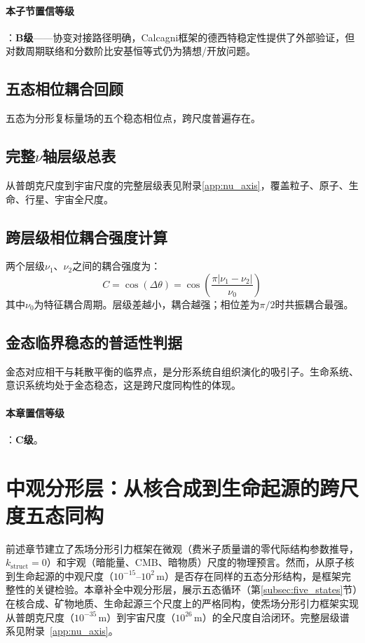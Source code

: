 \documentclass[12pt,a4paper,twocolumn]{article}
\begin{document}
\paragraph{本子节置信等级}：\textbf{B级}——协变对接路径明确，Calcagni框架的德西特稳定性提供了外部验证，但对数周期联络和分数阶比安基恒等式仍为猜想/开放问题。

\subsection{五态相位耦合回顾}
五态为分形复标量场的五个稳态相位点，跨尺度普遍存在。

\subsection{完整$\nu$轴层级总表}
从普朗克尺度到宇宙尺度的完整层级表见附录\ref{app:nu_axis}，覆盖粒子、原子、生命、行星、宇宙全尺度。

\subsection{跨层级相位耦合强度计算}
两个层级$\nu_1$、$\nu_2$之间的耦合强度为：
\[
C = \cos(\Delta\theta) = \cos\left( \frac{\pi |\nu_1-\nu_2|}{\nu_0} \right)
\]
其中$\nu_0$为特征耦合周期。层级差越小，耦合越强；相位差为$\pi/2$时共振耦合最强。

\subsection{金态临界稳态的普适性判据}
金态对应相干与耗散平衡的临界点，是分形系统自组织演化的吸引子。生命系统、意识系统均处于金态稳态，这是跨尺度同构性的体现。

\paragraph{本章置信等级}：\textbf{C级}。

\section{中观分形层：从核合成到生命起源的跨尺度五态同构}
\label{sec:mesoscopic}

前述章节建立了炁场分形引力框架在微观（费米子质量谱的零代际结构参数推导，$k_{\text{struct}}=0$）和宇观（暗能量、CMB、暗物质）尺度的物理预言。然而，从原子核到生命起源的中观尺度（$10^{-15}$--$10^{2}$\,m）是否存在同样的五态分形结构，是框架完整性的关键检验。本章补全中观分形层，展示五态循环（第\ref{subsec:five_states}节）在核合成、矿物地质、生命起源三个尺度上的严格同构，使炁场分形引力框架实现从普朗克尺度（$10^{-35}$\,m）到宇宙尺度（$10^{26}$\,m）的全尺度自洽闭环。完整层级谱系见附录~\ref{app:nu_axis}。
\end{document}
